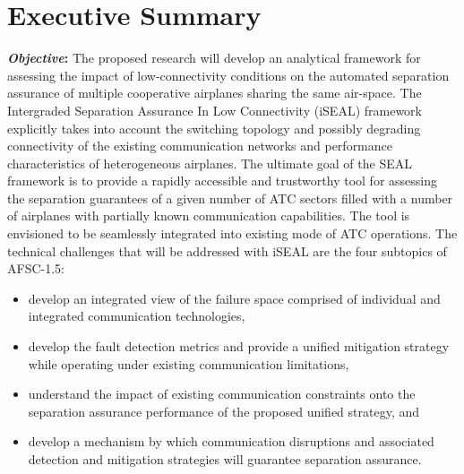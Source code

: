 \documentclass[letter,onecolumn,12pt]{aiaa-tc}
\begin{document}
\pagestyle{empty}

%

%


\section*{Executive Summary}

\textbf{\emph{Objective}:} The proposed research will develop an analytical framework for assessing the impact of low-connectivity conditions on the automated separation assurance of multiple cooperative airplanes sharing the same air-space. The Intergraded Separation Assurance In Low Connectivity (iSEAL) framework explicitly takes into account the switching topology and possibly degrading connectivity of the existing communication networks and performance characteristics of heterogeneous airplanes. The ultimate goal of the SEAL framework is to provide a rapidly accessible and trustworthy tool for assessing the separation guarantees of a given number of ATC sectors filled with a number of airplanes with partially known communication capabilities. The tool is envisioned to be seamlessly integrated into existing mode of ATC operations. The technical challenges that will be addressed with iSEAL are the four subtopics of AFSC-1.5:
\begin{itemize}
\setlength{\itemsep}{-4pt}
\vspace{-2mm}
    \item develop an integrated view of the failure space comprised of individual and integrated communication technologies,
    \item develop the fault detection metrics and provide a unified mitigation strategy while operating under existing communication limitations,
    \item understand the impact of existing communication constraints onto the separation assurance performance of the proposed unified strategy, and
    \item develop a mechanism by which communication disruptions and associated detection and mitigation strategies will guarantee separation assurance.
\end{itemize}
\end{document}
